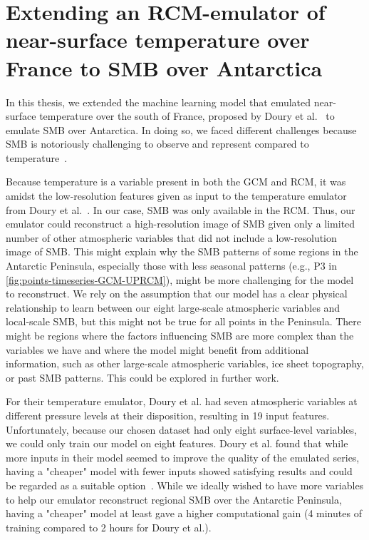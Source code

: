 \documentclass[a4paper,11pt,oneside]{report}
\begin{document}
\section{Extending an RCM-emulator of near-surface temperature over France to SMB over Antarctica}\label{sec:extension-doury}

In this thesis, we extended the machine learning model that emulated near-surface temperature over the south of France, proposed by Doury et al.~\cite{Doury} to emulate SMB over Antarctica. In doing so, we faced different challenges because SMB is notoriously challenging to observe and represent compared to temperature~\cite{Lenaerts2019}. 


Because temperature is a variable present in both the GCM and RCM, it was amidst the low-resolution features given as input to the temperature emulator from Doury et al.~\cite{Doury}. In our case, SMB was only available in the RCM. Thus, our emulator could reconstruct a high-resolution image of SMB given only a limited number of other atmospheric variables that did not include a low-resolution image of SMB. This might explain why the SMB patterns of some regions in the Antarctic Peninsula, especially those with less seasonal patterns (e.g., P3 in \autoref{fig:points-timeseries-GCM-UPRCM}), might be more challenging for the model to reconstruct. We rely on the assumption that our model has a clear physical relationship to learn between our eight large-scale atmospheric variables and local-scale SMB, but this might not be true for all points in the Peninsula. There might be regions where the factors influencing SMB are more complex than the variables we have and where the model might benefit from additional information, such as other large-scale atmospheric variables, ice sheet topography, or past SMB patterns. This could be explored in further work.


For their temperature emulator, Doury et al. had seven atmospheric variables at different pressure levels at their disposition, resulting in 19 input features. Unfortunately, because our chosen dataset had only eight surface-level variables, we could only train our model on eight features. Doury et al. found that while more inputs in their model seemed to improve the quality of the emulated series, having a "cheaper" model with fewer inputs showed satisfying results and could be regarded as a suitable option~\cite{Doury}. While we ideally wished to have more variables to help our emulator reconstruct regional SMB over the Antarctic Peninsula, having a "cheaper" model at least gave a higher computational gain (4 minutes of training compared to 2 hours for Doury et al.).  
\end{document}
